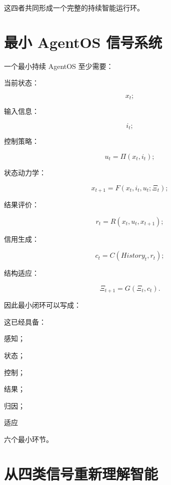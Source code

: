 这四者共同形成一个完整的持续智能运行环。

\section{最小 AgentOS 信号系统}

一个最小持续 AgentOS 至少需要：

当前状态：

\[
x_t;
\]

输入信息：

\[
i_t;
\]

控制策略：

\[
u_t
=
\Pi(x_t,i_t);
\]

状态动力学：

\[
x_{t+1}
=
F(x_t,i_t,u_t;\Xi_t);
\]

结果评价：

\[
r_t
=
R(
x_t,
u_t,
x_{t+1}
);
\]

信用生成：

\[
c_t
=
C(
History_t,
r_t
);
\]

结构适应：

\[
\Xi_{t+1}
=
G(
\Xi_t,
c_t
).
\]

因此最小闭环可以写成：

\begin{statementbox}
\centering
{}
\end{statementbox}

这已经具备：

感知；

状态；

控制；

结果；

归因；

适应

六个最小环节。

\section{从四类信号重新理解智能}

